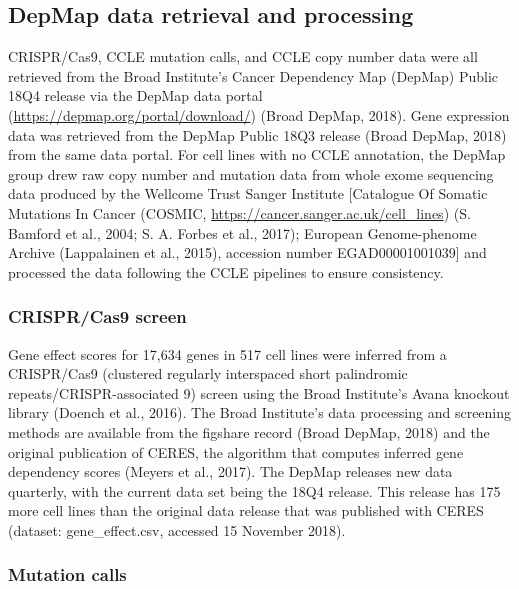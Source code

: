 \documentclass[man,floatsintext]{apa6}
\begin{document}
\subsection{DepMap data retrieval and
processing}\label{depmap-data-retrieval-and-processing}

CRISPR/Cas9, CCLE mutation calls, and CCLE copy number data were all
retrieved from the Broad Institute's Cancer Dependency Map (DepMap)
Public 18Q4 release via the DepMap data portal
(\url{https://depmap.org/portal/download/}) (Broad DepMap, 2018). Gene
expression data was retrieved from the DepMap Public 18Q3 release (Broad
DepMap, 2018) from the same data portal. For cell lines with no CCLE
annotation, the DepMap group drew raw copy number and mutation data from
whole exome sequencing data produced by the Wellcome Trust Sanger
Institute {[}Catalogue Of Somatic Mutations In Cancer (COSMIC,
\url{https://cancer.sanger.ac.uk/cell_lines}) (S. Bamford et al., 2004;
S. A. Forbes et al., 2017); European Genome-phenome Archive (Lappalainen
et al., 2015), accession number EGAD00001001039{]} and processed the
data following the CCLE pipelines to ensure consistency.

\subsubsection{CRISPR/Cas9 screen}\label{crisprcas9-screen}

Gene effect scores for 17,634 genes in 517 cell lines were inferred from
a CRISPR/Cas9 (clustered regularly interspaced short palindromic
repeats/CRISPR-associated 9) screen using the Broad Institute's Avana
knockout library (Doench et al., 2016). The Broad Institute's data
processing and screening methods are available from the figshare record
(Broad DepMap, 2018) and the original publication of CERES, the
algorithm that computes inferred gene dependency scores (Meyers et al.,
2017). The DepMap releases new data quarterly, with the current data set
being the 18Q4 release. This release has 175 more cell lines than the
original data release that was published with CERES (dataset:
gene\_effect.csv, accessed 15 November 2018).

\subsubsection{Mutation calls}\label{mutation-calls}
\end{document}
